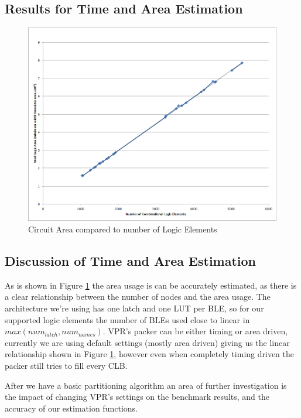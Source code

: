 \documentclass[12pt,drafta4paper,oneside]{memoir} %
\begin{document}
\subsection{Results for Time and Area Estimation}
\begin{figure}
    \includegraphics[width=\textwidth]{images/area-v-elements.png}
    \caption{Circuit Area compared to number of Logic Elements}
    \label{AreaVElements}
\end{figure}
\subsection{Discussion of Time and Area Estimation}
As is shown in Figure \ref{AreaVElements} the area usage is can be accurately estimated, as there is a clear relationship between the number of nodes and the area usage. The architecture we're using has one latch and one \ac{LUT} per \ac{BLE}, so for our supported logic elements the number of \acp{BLE} used close to linear in $max(num_{latch}, num_{names})$. \ac{VPR}'s packer can be either timing or area driven, currently we are using default settings (mostly area driven) giving us the linear relationship shown in Figure \ref{AreaVElements}, however even when completely timing driven the packer still tries to fill every \ac{CLB}\cite{AAPackThesis}.

After we have a basic partitioning algorithm an area of further investigation is the impact of changing \ac{VPR}'s settings on the benchmark results, and the accuracy of our estimation functions.
\end{document}
